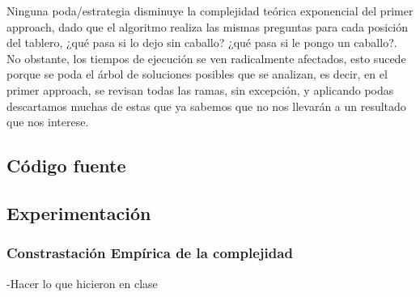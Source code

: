 Ninguna poda/estrategia disminuye la complejidad te\'orica exponencial del primer approach, dado que el algoritmo realiza las mismas preguntas para cada posici\'on del tablero, ¿qu\'e pasa si lo dejo sin caballo? ¿qu\'e pasa si le pongo un caballo?. No obstante, los tiempos de ejecuci\'on se ven radicalmente afectados, esto sucede porque se poda el \'arbol de soluciones posibles que se analizan, es decir, en el primer approach, se revisan todas las ramas, sin excepci\'on, y aplicando podas descartamos muchas de estas que ya sabemos que no nos llevar\'an a un resultado que nos interese.\\
\newpage

\subsection{C\'odigo fuente}
\newpage
\subsection{Experimentaci\'on}

\subsubsection*{Constrastaci\'on Emp\'irica de la complejidad}
-Hacer lo que hicieron en clase\\
\newpage
